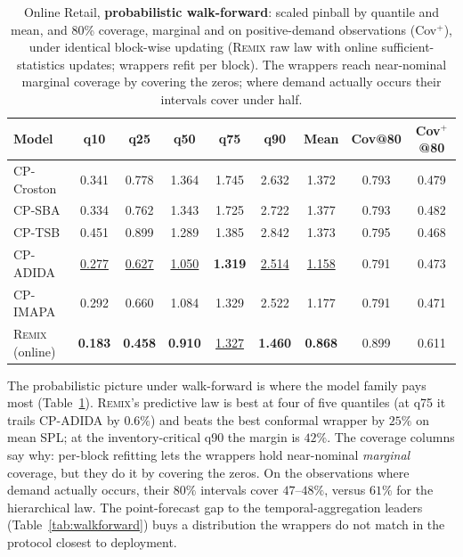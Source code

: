 \documentclass[twocolumn,10pt]{article}
\newcommand{\REMIX}{\textsc{Remix}}
\newcommand{\best}[1]{\textbf{#1}}
\newcommand{\secondbest}[1]{\underline{#1}}
\begin{document}
\begin{table}[t]
\centering
\caption{Online Retail, \textbf{probabilistic walk-forward}: scaled
pinball by quantile and mean, and 80\% coverage, marginal and on
positive-demand observations (Cov$^{+}$), under identical block-wise
updating (\REMIX{} raw law with online sufficient-statistics updates;
wrappers refit per block). The wrappers reach near-nominal marginal
coverage by covering the zeros; where demand actually occurs their
intervals cover under half.}
\label{tab:wfprob}
\small
\setlength{\tabcolsep}{2.9pt}
\begin{tabular}{lcccccccc}
\toprule
Model & q10 & q25 & q50 & q75 & q90 & Mean & Cov@80 & Cov$^{+}$@80\\
\midrule
CP-Croston & 0.341 & 0.778 & 1.364 & 1.745 & 2.632 & 1.372 & 0.793 & 0.479\\
CP-SBA & 0.334 & 0.762 & 1.343 & 1.725 & 2.722 & 1.377 & 0.793 & 0.482\\
CP-TSB & 0.451 & 0.899 & 1.289 & 1.385 & 2.842 & 1.373 & 0.795 & 0.468\\
CP-ADIDA & \secondbest{0.277} & \secondbest{0.627} & \secondbest{1.050} & \best{1.319} & \secondbest{2.514} & \secondbest{1.158} & 0.791 & 0.473\\
CP-IMAPA & 0.292 & 0.660 & 1.084 & 1.329 & 2.522 & 1.177 & 0.791 & 0.471\\
\midrule
\REMIX{} (online) & \best{0.183} & \best{0.458} & \best{0.910} & \secondbest{1.327} & \best{1.460} & \best{0.868} & 0.899 & 0.611\\
\bottomrule
\end{tabular}
\end{table}

The probabilistic picture under walk-forward is where the model family
pays most (Table~\ref{tab:wfprob}). \REMIX{}'s predictive law is best at
four of five quantiles (at q75 it trails CP-ADIDA by $0.6\%$) and beats
the best conformal wrapper by $25\%$ on mean SPL; at the
inventory-critical q90 the margin is $42\%$. The coverage columns say
why: per-block refitting lets the wrappers hold near-nominal
\emph{marginal} coverage, but they do it by covering the zeros. On the
observations where demand actually occurs, their $80\%$ intervals cover
$47$--$48\%$, versus $61\%$ for the hierarchical law. The point-forecast
gap to the temporal-aggregation leaders
(Table~\ref{tab:walkforward}) buys a distribution the wrappers do not
match in the protocol closest to deployment.
\end{document}
